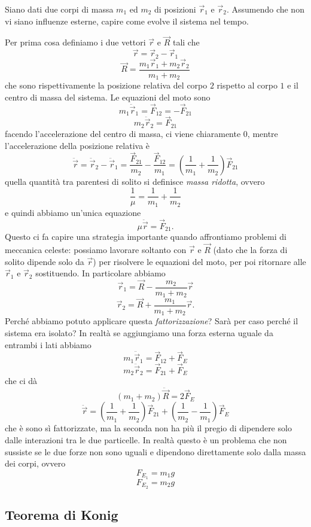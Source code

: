 \documentclass[11pt]{scrartcl}
\newcommand{\posit}{\vec{r}}
\newcommand{\accel}{\ddot{\vec{r}}}
\begin{document}
	\begin{problem}
		Siano dati due corpi di massa $m_1$ ed $m_2$ di posizioni $\posit_1$ e $\posit_2$. Assumendo che non vi siano influenze esterne, capire come evolve il sistema nel tempo.
	\end{problem}
	Per prima cosa definiamo i due vettori $\posit$ e $\vec{R}$ tali che
	$$\posit = \posit_2-\posit_1$$
	$$\vec{R}=\frac{m_1\posit_1+m_2\posit_2}{m_1+m_2}$$
	che sono rispettivamente la posizione relativa del corpo $2$ rispetto al corpo $1$ e il centro di massa del sistema. Le equazioni del moto sono
	$$m_1\accel_1=\vec{F}_{12}=-\vec{F}_{21}$$
	$$m_2\accel_2=\vec{F}_{21}$$
	facendo l'accelerazione del centro di massa, ci viene chiaramente $0$, mentre l'accelerazione della posizione relativa è
	$$\accel=\accel_2-\accel_1=\frac{\vec{F}_{21}}{m_2}-\frac{\vec{F}_{12}}{m_1}=\left(\frac{1}{m_1}+\frac{1}{m_2}\right)\vec{F}_{21}$$
	quella quantità tra parentesi di solito si definisce \textit{massa ridotta}, ovvero
	$$\frac{1}{\mu}=\frac{1}{m_1}+\frac{1}{m_2}$$
	e quindi abbiamo un'unica equazione
	$$\mu \accel = \vec{F}_{21}.$$
	Questo ci fa capire una strategia importante quando affrontiamo problemi di meccanica celeste: possiamo lavorare soltanto con $\posit$ e $\vec{R}$ (dato che la forza di solito dipende solo da $\posit$) per risolvere le equazioni del moto, per poi ritornare alle $\posit_1$ e $\posit_2$ sostituendo. In particolare abbiamo
	$$\posit_1=\vec{R}-\frac{m_2}{m_1+m_2}\posit$$
	$$\posit_2=\vec{R}+\frac{m_1}{m_1+m_2}\posit.$$
	Perché abbiamo potuto applicare questa \textit{fattorizzazione}? Sarà per caso perché il sistema era isolato? In realtà se aggiungiamo una forza esterna uguale da entrambi i lati abbiamo
	$$m_1\accel_1=\vec{F}_{12}+\vec{F}_E$$
	$$m_2\accel_2=\vec{F}_{21}+\vec{F}_E$$
	che ci dà
	$$\left(m_1+m_2\right)\ddot{\vec{R}}=2\vec{F}_E$$
	$$\accel=\left(\frac{1}{m_1}+\frac{1}{m_2}\right)\vec{F}_{21}+\left(\frac{1}{m_2}-\frac{1}{m_1}\right)\vec{F}_E$$
	che è sono sì fattorizzate, ma la seconda non ha più il pregio di dipendere solo dalle interazioni tra le due particelle. In realtà questo è un problema che non sussiste se le due forze non sono uguali e dipendono direttamente solo dalla massa dei corpi, ovvero
	$$F_{E_1}=m_1g$$
	$$F_{E_2}=m_2g$$
	
	\subsection{Teorema di Konig}
	
\end{document}
